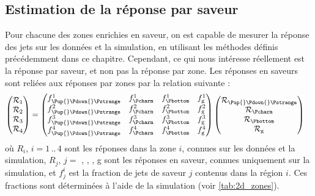 \subsection{Estimation de la réponse par saveur}

Pour chacune des zones enrichies en saveur, on est capable de mesurer la réponse des jets sur les données et la simulation, en utilisant les méthodes définis précédemment dans ce chapitre. Cependant, ce qui nous intéresse réellement est la réponse par saveur, et non pas la réponse par zone. Les réponses en saveurs sont reliées aux réponses par zones par la relation suivante :
\begin{align} \label{eq:resp_zone}
  \begin{pmatrix}
    \mathcal{R}_1 \\ \mathcal{R}_2 \\ \mathcal{R}_3 \\ \mathcal{R}_4
  \end{pmatrix}
  &=
  \begin{pmatrix}
    f^1_{\text{\Pup{}\Pdown{}\Pstrange}} & f^1_{\Pcharm} & f^1_{\Pbottom} & f^1_\text{g} \\
    f^2_{\text{\Pup{}\Pdown{}\Pstrange}} & f^2_{\Pcharm} & f^2_{\Pbottom} & f^2_\text{g} \\
    f^3_{\text{\Pup{}\Pdown{}\Pstrange}} & f^3_{\Pcharm} & f^3_{\Pbottom} & f^3_\text{g} \\
    f^4_{\text{\Pup{}\Pdown{}\Pstrange}} & f^4_{\Pcharm} & f^4_{\Pbottom} & f^4_\text{g}
  \end{pmatrix}
  \begin{pmatrix}
    \mathcal{R_\text{\Pup{}\Pdown{}\Pstrange}} \\
    \mathcal{R_{\Pcharm}} \\
    \mathcal{R_{\Pbottom}} \\
    \mathcal{R_\text{g}}
  \end{pmatrix}
\end{align}
où $R_i$, $i = 1\,..\,4$ sont les réponses dans la zone $i$, connues sur les données et la simulation, $R_j$, $j = $ \Pup{}\Pdown{}\Pstrange, \Pcharm, \Pbottom, g sont les réponses en saveur, connues uniquement sur la simulation, et $f^i_j$ est la fraction de jets de saveur $j$ contenus dans la région $i$. Ces fractions sont déterminées à l'aide de la simulation (voir \cref{tab:2d_zones}).

